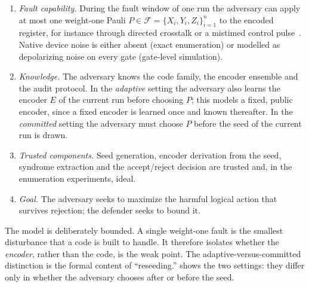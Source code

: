 \begin{assumption}\label{ass:qec:model}
\begin{enumerate}
  \item \emph{Fault capability.} During the fault window of one run the adversary can apply at most one weight-one Pauli $P\in\mathcal{F}=\{X_i,Y_i,Z_i\}_{i=1}^{n}$ to the encoded register, for instance through directed crosstalk or a mistimed control pulse~\cite{ashsaki2020crosstalk}. Native device noise is either absent (exact enumeration) or modelled as depolarizing noise on every gate (gate-level simulation).
  \item \emph{Knowledge.} The adversary knows the code family, the encoder ensemble and the audit protocol. In the \emph{adaptive} setting the adversary also learns the encoder $E$ of the current run before choosing $P$; this models a fixed, public encoder, since a fixed encoder is learned once and known thereafter. In the \emph{committed} setting the adversary must choose $P$ before the seed of the current run is drawn.
  \item \emph{Trusted components.} Seed generation, encoder derivation from the seed, syndrome extraction and the accept/reject decision are trusted and, in the enumeration experiments, ideal.
  \item \emph{Goal.} The adversary seeks to maximize the harmful logical action that survives rejection; the defender seeks to bound it.
\end{enumerate}
\end{assumption}

The model is deliberately bounded. A single weight-one fault is the smallest disturbance that a code is built to handle. It therefore isolates whether the \emph{encoder}, rather than the code, is the weak point. The adaptive-versus-committed distinction is the formal content of ``reseeding.''  shows the two settings: they differ only in whether the adversary chooses after or before the seed.

